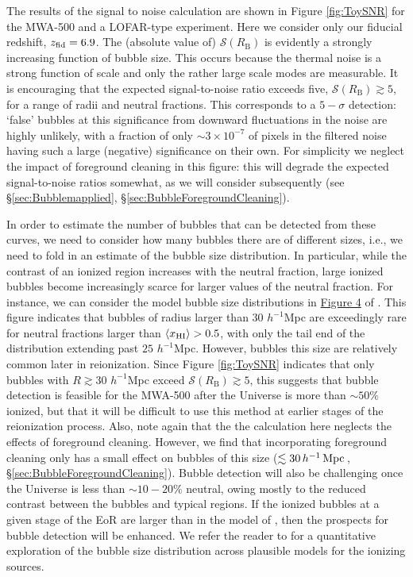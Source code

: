 The results of the signal to noise calculation are shown in Figure
\ref{fig:ToySNR} for the MWA-500 and a LOFAR-type experiment. 
Here we consider only our
fiducial redshift, $z_{\rm fid} = 6.9$. The (absolute value of)
$\mathcal{S}(R_{\text{B}})$ is evidently a strongly increasing
function of bubble size. This occurs because the thermal noise is a
strong function of scale and only the rather large scale modes are
measurable. It is encouraging that the expected signal-to-noise ratio
exceeds five, $\mathcal{S}(R_{\text{B}}) \gtrsim 5$, for a range of
radii and neutral fractions. This corresponds to a $5-\sigma$
detection: `false' bubbles at this significance from downward
fluctuations in the noise are highly unlikely, with a fraction of 
only $\sim 3 \times 10^{-7}$ of pixels in the filtered noise having such a large
(negative) significance on their own. For simplicity we neglect
the impact of foreground cleaning in this figure: this will 
degrade the expected signal-to-noise ratios somewhat, as we will
consider subsequently (see \S \ref{sec:Bubblemapplied}, \S \ref{sec:BubbleForegroundCleaning}).

In order to estimate the number of bubbles that can be detected from these curves, we need to consider
how many bubbles there are of different sizes, i.e., we need to fold in an estimate of the bubble
size distribution. In particular, while the contrast of an ionized region increases with the
neutral fraction, large ionized bubbles become increasingly scarce for larger values of the neutral
fraction. For instance, we can consider the model bubble size distributions in
\href{http://iopscience.iop.org/0004-637X/654/1/12/fulltext/65071.fg4.html}{Figure
  4} of \citet{Zahn:2006sg}. This figure indicates that bubbles of radius larger than $30$ $h^{-1}$Mpc
are exceedingly rare for neutral fractions larger than $\langle x_{\rm HI}\rangle > 0.5$, with only
the tail end of the distribution extending past $25$ $h^{-1}$Mpc. However, bubbles this size
are relatively common later in reionization. Since Figure \ref{fig:ToySNR} indicates
that only bubbles with $R \gtrsim 30$ $h^{-1}$Mpc exceed $\mathcal{S}(R_{\text{B}}) \gtrsim 5$,
this suggests that bubble detection is feasible for the MWA-500 after the Universe is more than
$\sim 50\%$ ionized, but that it will be difficult to use this method at earlier
stages of the reionization process. Also, note again that the the calculation here neglects the effects of foreground cleaning. However, we find that incorporating foreground cleaning only has a small effect on bubbles of this size ($\lesssim 30\,h^{-1}\,{\rm Mpc}\,$, \S \ref{sec:BubbleForegroundCleaning}). Bubble detection will also be challenging once
the Universe is less than $\sim 10-20\%$ neutral, owing mostly to the reduced contrast
between the bubbles and typical regions. If the ionized bubbles at a given stage of the EoR are larger than in
the model of \citet{Zahn:2006sg}, then the prospects for bubble detection will be enhanced. We refer
the reader to \citet{McQuinn:2006et} for a quantitative exploration of the bubble size distribution across
plausible models for the ionizing sources.




